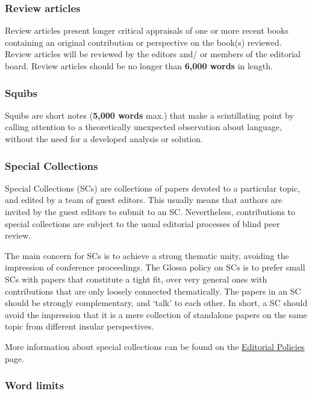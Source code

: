 \documentclass[charis,linguex]{glossa}
\begin{document}
\subsubsection{Review articles}

Review articles present longer critical appraisals of one or more recent books containing an original contribution or perspective on the book(s) reviewed. Review articles will be reviewed by the editors and/ or members of the editorial board. Review articles should be no longer than \textbf{6,000 words} in length.

\subsubsection{Squibs}

Squibs are short notes (\textbf{5,000 words} max.) that make a scintillating point by calling attention to a theoretically unexpected observation about language, without the need for a developed analysis or solution.

\subsubsection{Special Collections}

Special Collections (SCs) are collections of papers devoted to a particular topic, and edited by a team of guest editors. This usually means that authors are invited by the guest editors to submit to an SC. Nevertheless, contributions to special collections are subject to the usual editorial processes of blind peer review. 

The main concern for SCs is to achieve a strong thematic unity, avoiding the impression of conference proceedings. The Glossa policy on SCs is to prefer small SCs with papers that constitute a tight fit, over very general ones with contributions that are only loosely connected thematically. The papers in an SC should be strongly complementary, and ‘talk’ to each other. In short, a SC should avoid the impression that it is a mere collection of standalone papers on the same topic from different insular perspectives.

More information about special collections can be found on the \href{https://www.glossa-journal.org/site/editorial-policies/}{Editorial Policies} page.



\subsubsection{Word limits}
\end{document}
